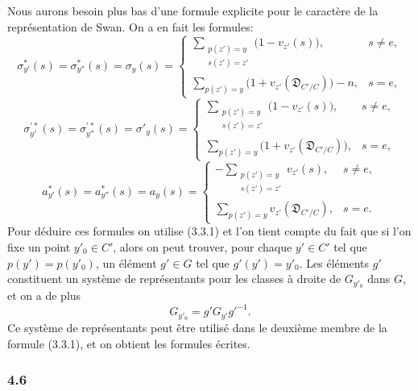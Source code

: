 \documentclass[11pt]{article}
\begin{document}
Nous aurons besoin plus bas d'une formule explicite pour le caractère de la représentation de Swan. On a en fait les formules:
\[
\sigma^{*}_{y'}(s)=\sigma^{*}_{y''}(s)=\sigma_y(s)=
\begin{cases}
\displaystyle\sum_{\substack{p(z')=y\\s(z')=z'}}\bigl(1-v_{z'}(s)\bigr),& s\ne e,\\[0.8em]
\displaystyle\sum_{p(z')=y}\bigl(1+v_{z'}(\mathfrak D_{C'/C})\bigr)-n,& s=e,
\end{cases}
\tag{4.5.1}
\]
\[
\sigma^{\prime*}_{y'}(s)=\sigma^{\prime*}_{y''}(s)=\sigma'_y(s)=
\begin{cases}
\displaystyle\sum_{\substack{p(z')=y\\s(z')=z'}}\bigl(1-v_{z'}(s)\bigr),& s\ne e,\\[0.8em]
\displaystyle\sum_{p(z')=y}\bigl(1+v_{z'}(\mathfrak D_{C'/C})\bigr),& s=e,
\end{cases}
\tag{4.5.2}
\]
\[
a^{*}_{y'}(s)=a^{*}_{y''}(s)=a_y(s)=
\begin{cases}
\displaystyle-\sum_{\substack{p(z')=y\\s(z')=z'}}v_{z'}(s),& s\ne e,\\[0.8em]
\displaystyle\sum_{p(z')=y}v_{z'}(\mathfrak D_{C'/C}),& s=e.
\end{cases}
\tag{4.5.3}
\]
Pour déduire ces formules on utilise (3.3.1) et l'on tient compte du fait que si l'on fixe un point $y'_0\in C'$, alors on peut trouver, pour chaque $y'\in C'$ tel que $p(y')=p(y'_0)$, un élément $g'\in G$ tel que $g'(y')=y'_0$. Les éléments $g'$ constituent un système de représentants pour les classes à droite de $G_{y'_0}$ dans $G$, et on a de plus
\[
G_{y'_0}=g'G_{y'}g'^{-1}.
\]
Ce système de représentants peut être utilisé dans le deuxième membre de la formule (3.3.1), et on obtient les formules écrites.

\subsubsection*{4.6}
\end{document}
